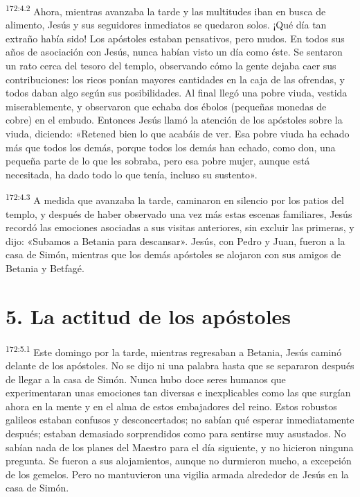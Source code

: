\par 
\textsuperscript{172:4.2} Ahora, mientras avanzaba la tarde y las multitudes iban en busca de alimento, Jesús y sus seguidores inmediatos se quedaron solos. ¡Qué día tan extraño había sido! Los apóstoles estaban pensativos, pero mudos. En todos sus años de asociación con Jesús, nunca habían visto un día como éste. Se sentaron un rato cerca del tesoro del templo, observando cómo la gente dejaba caer sus contribuciones: los ricos ponían mayores cantidades en la caja de las ofrendas, y todos daban algo según sus posibilidades. Al final llegó una pobre viuda, vestida miserablemente, y observaron que echaba dos ébolos
(pequeñas monedas de cobre) en el embudo. Entonces Jesús llamó la atención de los apóstoles sobre la viuda, diciendo: «Retened bien lo que acabáis de ver. Esa pobre viuda ha echado más que todos los demás, porque todos los demás han echado, como don, una pequeña parte de lo que les sobraba, pero esa pobre mujer, aunque está necesitada, ha dado todo lo que tenía, incluso su sustento».

\par 
\textsuperscript{172:4.3} A medida que avanzaba la tarde, caminaron en silencio por los patios del templo, y después de haber observado una vez más estas escenas familiares, Jesús recordó las emociones asociadas a sus visitas anteriores, sin excluir las primeras, y dijo: «Subamos a Betania para descansar». Jesús, con Pedro y Juan, fueron a la casa de Simón, mientras que los demás apóstoles se alojaron con sus amigos de Betania y Betfagé.

\section*{5. La actitud de los apóstoles}
\par 
\textsuperscript{172:5.1} Este domingo por la tarde, mientras regresaban a Betania, Jesús caminó delante de los apóstoles. No se dijo ni una palabra hasta que se separaron después de llegar a la casa de Simón. Nunca hubo doce seres humanos que experimentaran unas emociones tan diversas e inexplicables como las que surgían ahora en la mente y en el alma de estos embajadores del reino. Estos robustos galileos estaban confusos y desconcertados; no sabían qué esperar inmediatamente después; estaban demasiado sorprendidos como para sentirse muy asustados. No sabían nada de los planes del Maestro para el día siguiente, y no hicieron ninguna pregunta. Se fueron a sus alojamientos, aunque no durmieron mucho, a excepción de los gemelos. Pero no mantuvieron una vigilia armada alrededor de Jesús en la casa de Simón.

